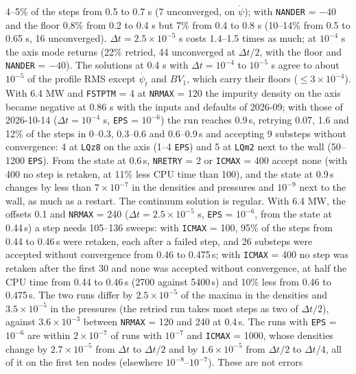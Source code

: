 \documentclass[11pt]{article}
\def\psid{\dot{\psi}}
\def\psit{\psi_t}
\def\psitd{\dot{\psit}}
\begin{document}
\begin{itemize}
  4--5\% of the steps from 0.5 to 0.7 s (7 unconverged, on $\psid$); with \texttt{NANDER} = $-40$ and
  the floor 0.8\% from 0.2 to 0.4 s but 7\% from 0.4 to 0.8 s (10--14\% from 0.5 to 0.65 s, 16
  unconverged).  $\Delta t = 2.5\times10^{-5}$ s costs 1.4--1.5 times as much; at $10^{-4}$ s the axis
  mode returns (22\% retried, 44 unconverged at $\Delta t/2$, with the floor and \texttt{NANDER} =
  $-40$).  The solutions at 0.4 s with
  $\Delta t = 10^{-4}$ to $10^{-5}$ s agree to about $10^{-5}$ of the profile RMS except $\psitd$ and
  $BV_1$, which carry their floors ($\le 3\times10^{-4}$).  With 6.4 MW and \texttt{FSTPTM} = 4 at \texttt{NRMAX} = 120 the impurity density on the
  axis became negative at 0.86 s with the inputs and defaults of 2026-09; with those of 2026-10-14
  ($\Delta t = 10^{-4}$ s, \texttt{EPS} = $10^{-6}$) the run reaches 0.9\,s, retrying 0.07, 1.6 and 12\% of the
  steps in 0--0.3, 0.3--0.6 and 0.6--0.9\,s and accepting 9 substeps without convergence: 4 at
  \texttt{LQz8} on the axis (1--4 \texttt{EPS}) and 5 at \texttt{LQm2} next to the wall (50--1200
  \texttt{EPS}).  From the state at 0.6\,s, \texttt{NRETRY} = 2 or \texttt{ICMAX} = 400 accept none (with
  400 no step is retaken, at 11\% less CPU time than 100), and the state at 0.9\,s changes by less than
  $7\times10^{-7}$ in the densities and pressures and $10^{-9}$ next to the wall, as much as a restart.
  The continuum solution is regular.
  With 6.4 MW, the offsets 0.1 and \texttt{NRMAX} = 240 ($\Delta t = 2.5\times10^{-5}$ s,
  \texttt{EPS} = $10^{-6}$, from the state at 0.44\,s) a step needs 105--136 sweeps: with
  \texttt{ICMAX} = 100, 95\% of the steps from 0.44 to 0.46\,s were retaken, each after a failed step,
  and 26 substeps were accepted without convergence from 0.46 to 0.475\,s; with \texttt{ICMAX} = 400
  no step was retaken after the first 30 and none was accepted without convergence, at half the CPU
  time from 0.44 to 0.46\,s (2700 against 5400\,s) and 10\% less from 0.46 to 0.475\,s.  The two runs
  differ by $2.5\times10^{-5}$ of the maxima in the densities and $3.5\times10^{-5}$ in the pressures
  (the retried run takes most steps as two of $\Delta t/2$), against $3.6\times10^{-3}$ between
  \texttt{NRMAX} = 120 and 240 at 0.4\,s.  The runs with \texttt{EPS} = $10^{-6}$ are within
  $2\times10^{-7}$ of runs with $10^{-7}$ and \texttt{ICMAX} = 1000, whose densities change by
  $2.7\times10^{-5}$ from $\Delta t$ to $\Delta t/2$ and by $1.6\times10^{-5}$ from $\Delta t/2$ to
  $\Delta t/4$, all of it on the first ten nodes (elsewhere $10^{-8}$--$10^{-7}$).  These are not errors

\end{itemize}
\end{document}
